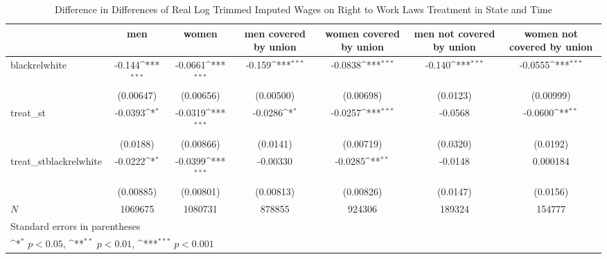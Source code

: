 \begin{table}[htbp]\centering
\def\sym#1{\ifmmode^{#1}\else\(^{#1}\)\fi}
\caption{Difference in Differences of Real Log Trimmed Imputed Wages on Right to Work Laws Treatment in State and Time}
\begin{tabular}{l*{6}{c}}
\hline\hline
            &\multicolumn{1}{c}{men}&\multicolumn{1}{c}{women}&\multicolumn{1}{c}{men covered by union}&\multicolumn{1}{c}{women covered by union}&\multicolumn{1}{c}{men not covered by union}&\multicolumn{1}{c}{women not covered by union}\\
\hline
blackrelwhite&      -0.144\sym{***}&     -0.0661\sym{***}&      -0.159\sym{***}&     -0.0838\sym{***}&      -0.140\sym{***}&     -0.0555\sym{***}\\
            &   (0.00647)         &   (0.00656)         &   (0.00500)         &   (0.00698)         &    (0.0123)         &   (0.00999)         \\
[1em]
treat\_st    &     -0.0393\sym{*}  &     -0.0319\sym{***}&     -0.0286\sym{*}  &     -0.0257\sym{***}&     -0.0568         &     -0.0600\sym{**} \\
            &    (0.0188)         &   (0.00866)         &    (0.0141)         &   (0.00719)         &    (0.0320)         &    (0.0192)         \\
[1em]
treat\_stblackrelwhite&     -0.0222\sym{*}  &     -0.0399\sym{***}&    -0.00330         &     -0.0285\sym{**} &     -0.0148         &    0.000184         \\
            &   (0.00885)         &   (0.00801)         &   (0.00813)         &   (0.00826)         &    (0.0147)         &    (0.0156)         \\
\hline
\(N\)       &     1069675         &     1080731         &      878855         &      924306         &      189324         &      154777         \\
\hline\hline
\multicolumn{7}{l}{\footnotesize Standard errors in parentheses}\\
\multicolumn{7}{l}{\footnotesize \sym{*} \(p<0.05\), \sym{**} \(p<0.01\), \sym{***} \(p<0.001\)}\\
\end{tabular}
\end{table}
